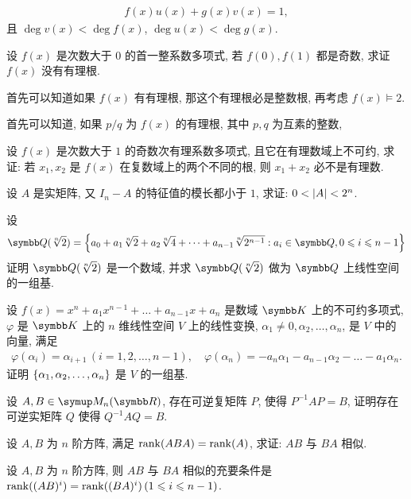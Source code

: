 \begin{exercise}[series=exer]
\begin{align*}
        f(x)u(x) + g(x)v(x) = 1,
    \end{align*}
    且 $ \deg v(x) < \deg f(x) $, $ \deg u(x) < \deg g(x) $.  
    \item 设 $ f(x) $ 是次数大于 $ 0 $ 的首一整系数多项式, 若 $ f(0), f(1) $ 都是奇数, 求证 $ f(x) $ 没有有理根.
    \begin{hint}
        首先可以知道如果 $ f(x) $ 有有理根, 那这个有理根必是整数根, 再考虑 $ f(x) \models 2 $. 
    \end{hint}
    \begin{answer}
        首先可以知道, 如果 $ p/q $ 为 $ f(x) $ 的有理根, 其中 $ p, q $ 为互素的整数, 
    \end{answer}
    \item 设 $ f(x) $ 是次数大于 $ 1 $ 的奇数次有理系数多项式, 且它在有理数域上不可约, 求证: 若 $ x_{1}, x_{2} $ 是 $ f(x) $ 在复数域上的两个不同的根, 则 $ x_{1} + x_{2} $ 必不是有理数.
    \item 设 $ A $ 是实矩阵, 又 $ I_{n} - A $ 的特征值的模长都小于 $ 1 $, 求证: $ 0<\abs{A}<2^{n} $. 
    \item 设
    \begin{align*}
        \Q(\sqrt[n]{2}) = \set{a_{0} + a_{1}\sqrt[n]{2} + a_{2}\sqrt[n]{4} + \dots + a_{n-1}\sqrt[n]{2^{n-1}} : a_{i} \in \Q, 0\le i\le n-1}
    \end{align*}
    证明 $ \Q(\sqrt[n]{2}) $ 是一个数域, 并求 $ \Q(\sqrt[n]{2}) $ 做为 $ \Q $ 上线性空间的一组基.
    \item 设 $ f(x) = x^{n} + a_{1}x^{n-1} + \dots + a_{n-1}x + a_{n} $ 是数域 $ \K $ 上的不可约多项式, $ \varphi $ 是 $ \K $ 上的 $ n $ 维线性空间 $ V $ 上的线性变换, $ \alpha_{1} \ne 0, \alpha_{2}, \dots, \alpha_{n} $, 是 $ V $ 中的向量, 满足 
    \begin{align*}
        \varphi(\alpha_{i}) = \alpha_{i + 1}\,(i = 1, 2, \dots, n-1), \quad \varphi(\alpha_{n}) = -a_{n}\alpha_{1} - a_{n-1}\alpha_{2} - \dots - a_{1}\alpha_{n}.
    \end{align*}
    证明 $ \qty{\alpha_{1}, \alpha_{2}, \dots, \alpha_{n}} $ 是 $ V $ 的一组基. 
    \item\label{item:CtoR} 设 $ A, B \in \MM $, 存在可逆复矩阵 $ P $, 使得 $ P^{-1}AP = B $, 证明存在可逆实矩阵 $ Q $ 使得 $ Q^{-1}AQ = B $.   
    \item 设 $ A, B $ 为 $ n $ 阶方阵, 满足 $ \rank(ABA) = \rank(A) $, 求证: $ AB $ 与 $ BA $ 相似.
    \item 设 $ A, B $ 为 $ n $ 阶方阵, 则 $ AB $ 与 $ BA $ 相似的充要条件是 $ \rank((AB)^{i}) = \rank((BA)^{i})\,(1 \leqslant i \leqslant n - 1) $.

\end{exercise}

